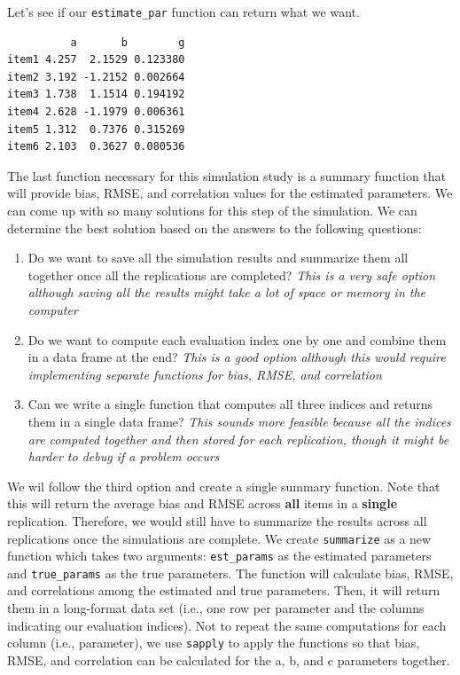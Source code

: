 \documentclass[
]{book}
\newenvironment{Shaded}{\begin{snugshade}}{\end{snugshade}}
\newcommand{\DataTypeTok}[1]{\textcolor[rgb]{0.13,0.29,0.53}{#1}}
\newcommand{\DecValTok}[1]{\textcolor[rgb]{0.00,0.00,0.81}{#1}}
\newcommand{\KeywordTok}[1]{\textcolor[rgb]{0.13,0.29,0.53}{\textbf{#1}}}
\newcommand{\NormalTok}[1]{#1}
\newcommand{\OperatorTok}[1]{\textcolor[rgb]{0.81,0.36,0.00}{\textbf{#1}}}
\begin{document}
Let's see if our \texttt{estimate\_par} function can return what we want.

\begin{Shaded}
\end{Shaded}

\begin{verbatim}
          a       b        g
item1 4.257  2.1529 0.123380
item2 3.192 -1.2152 0.002664
item3 1.738  1.1514 0.194192
item4 2.628 -1.1979 0.006361
item5 1.312  0.7376 0.315269
item6 2.103  0.3627 0.080536
\end{verbatim}

The last function necessary for this simulation study is a summary function that will provide bias, RMSE, and correlation values for the estimated parameters. We can come up with so many solutions for this step of the simulation. We can determine the best solution based on the answers to the following questions:

\begin{enumerate}
\def\labelenumi{\arabic{enumi}.}
\item
  Do we want to save all the simulation results and summarize them all together once all the replications are completed? \emph{This is a very safe option although saving all the results might take a lot of space or memory in the computer}
\item
  Do we want to compute each evaluation index one by one and combine them in a data frame at the end? \emph{This is a good option although this would require implementing separate functions for bias, RMSE, and correlation}
\item
  Can we write a single function that computes all three indices and returns them in a single data frame? \emph{This sounds more feasible because all the indices are computed together and then stored for each replication, though it might be harder to debug if a problem occurs}
\end{enumerate}

We wil follow the third option and create a single summary function. Note that this will return the average bias and RMSE across \textbf{all} items in a \textbf{single} replication. Therefore, we would still have to summarize the results across all replications once the simulations are complete. We create \texttt{summarize} as a new function which takes two arguments: \texttt{est\_params} as the estimated parameters and \texttt{true\_params} as the true parameters. The function will calculate bias, RMSE, and correlations among the estimated and true parameters. Then, it will return them in a long-format data set (i.e., one row per parameter and the columns indicating our evaluation indices). Not to repeat the same computations for each column (i.e., parameter), we use \texttt{sapply} to apply the functions so that bias, RMSE, and correlation can be calculated for the a, b, and c parameters together.
\end{document}
